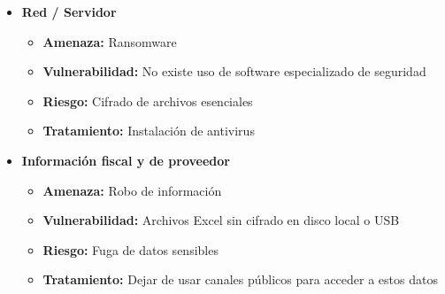 \begin{itemize}
    \item \textbf{Red / Servidor}
    \begin{itemize}
        \item \textbf{Amenaza:} Ransomware
        \item \textbf{Vulnerabilidad:} No existe uso de software especializado de seguridad
        \item \textbf{Riesgo:} Cifrado de archivos esenciales
        \item \textbf{Tratamiento:} Instalación de antivirus
    \end{itemize}

    \item \textbf{Información fiscal y de proveedor}
    \begin{itemize}
        \item \textbf{Amenaza:} Robo de información
        \item \textbf{Vulnerabilidad:} Archivos Excel sin cifrado en disco local o USB
        \item \textbf{Riesgo:} Fuga de datos sensibles
        \item \textbf{Tratamiento:} Dejar de usar canales públicos para acceder a estos datos
    \end{itemize}
\end{itemize}
